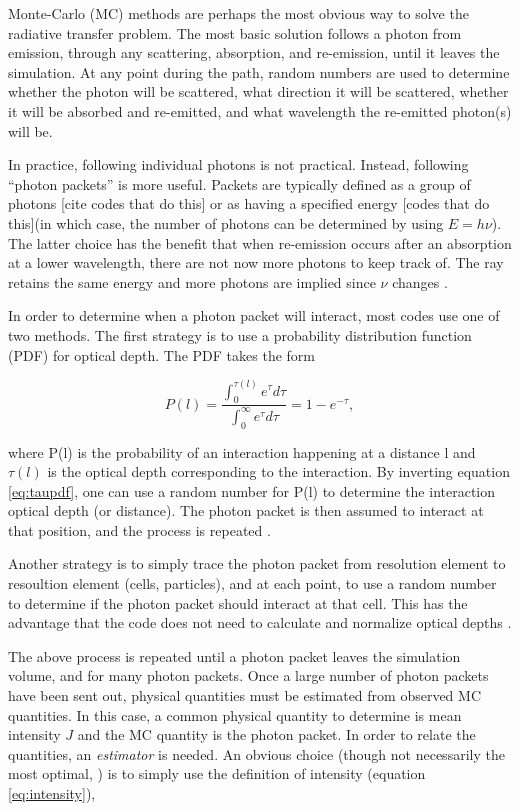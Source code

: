 Monte-Carlo (MC) methods are perhaps the most obvious way to solve the radiative transfer problem. The most basic solution follows a photon from emission, through any scattering, absorption, and re-emission, until it leaves the simulation. At any point during the path, random numbers are used to determine whether the photon will be scattered, what direction it will be scattered, whether it will be absorbed and re-emitted, and what wavelength the re-emitted photon(s) will be.

In practice, following individual photons is not practical. Instead, following ``photon packets'' is more useful. Packets are typically defined as a group of photons [cite codes that do this] or as having a specified energy [codes that do this](in which case, the number of photons can be determined by using $E = h\nu$). The latter choice has the benefit that when re-emission occurs after an absorption at a lower wavelength, there are not now more photons to keep track of. The ray retains the same energy and more photons are implied since $\nu$ changes \citep{ercolanoEt03,abbottLucy85}.

In order to determine when a photon packet will interact, most codes use one of two methods. The first strategy is to use a probability distribution function (PDF) for optical depth. The PDF takes the form

\begin{equation}
\label{eq:taupdf}
P(l) = \frac{\int_0^{\tau(l)}e^{\tau}d\tau}{\int_0^{\infty}e^{\tau}d\tau} = 1-e^{-\tau},
\end{equation}

where P(l) is the probability of an interaction happening at a distance l and $\tau(l)$ is the optical depth corresponding to the interaction. By inverting equation \ref{eq:taupdf}, one can use a random number for P(l) to determine the interaction optical depth (or distance). The photon packet is then assumed to interact at that position, and the process is repeated \citep{harriesHoworth97}.

Another strategy is to simply trace the photon packet from resolution element to resoultion element (cells, particles), and at each point, to use a random number to determine if the photon packet should interact at that cell. This has the advantage that the code does not need to calculate and normalize optical depths \citep{lucy99,ercolanoEt03}.

The above process is repeated until a photon packet leaves the simulation volume, and for many photon packets. Once a large number of photon packets have been sent out, physical quantities must be estimated from observed MC quantities. In this case, a common physical quantity to determine is mean intensity $J$ and the MC quantity is the photon packet. In order to relate the quantities, an \emph{estimator} is needed. An obvious choice (though not necessarily the most optimal, \citet{ercolanoEt2003}) is to simply use the definition of intensity (equation \ref{eq:intensity}),

